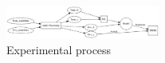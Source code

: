 \documentclass{article}
\begin{document}

 	
	\begin{figure}[h]
 		\begin{center}
		\includegraphics[width=0.45\textwidth]{process} 
  		\end{center}
  		\caption{Experimental process}
  		\label{process} 
 	\end{figure}

\end{document}
